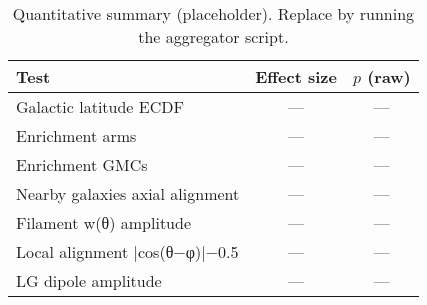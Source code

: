 
\begin{table}[t]
\centering
\begin{tabular}{lcc}
\toprule
Test & Effect size & $p$ (raw) \\
\midrule
Galactic latitude ECDF & — & — \\
Enrichment arms & — & — \\
Enrichment GMCs & — & — \\
Nearby galaxies axial alignment & — & — \\
Filament w(θ) amplitude & — & — \\
Local alignment |cos(θ−φ)|−0.5 & — & — \\
LG dipole amplitude & — & — \\
\bottomrule
\end{tabular}
\caption{Quantitative summary (placeholder). Replace by running the aggregator script.}
\label{tab:quant_summary}
\end{table}
